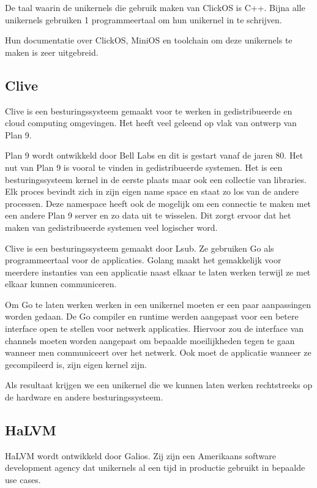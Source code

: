 \documentclass[pdftex,a4paper,12pt,twoside]{report}
\begin{document}
De taal waarin de unikernels die gebruik maken van ClickOS is C++. Bijna alle unikernels gebruiken 1 programmeertaal om hun unikernel in te schrijven.

Hun documentatie over ClickOS, MiniOS en toolchain om deze unikernels te maken is zeer uitgebreid.

\subsection{Clive}

Clive is een besturingssysteem gemaakt voor te werken in gedistribueerde en cloud computing omgevingen. Het heeft veel geleend op vlak van ontwerp van Plan 9. 

Plan 9 wordt ontwikkeld door Bell Labs en dit is gestart vanaf de jaren 80. Het nut van Plan 9 is vooral te vinden in gedistribueerde systemen. Het is een besturingssysteem kernel in de eerste plaats maar ook een collectie van libraries. Elk proces bevindt zich in zijn eigen name space en staat zo los van de andere processen. Deze namespace heeft ook de mogelijk om een connectie te maken met een andere Plan 9 server en zo data uit te wisselen. Dit zorgt ervoor dat het maken van gedistribueerde systemen veel logischer word.

Clive is een besturingssysteem gemaakt door Lsub. Ze gebruiken Go als programmeertaal voor de applicaties. Golang maakt het gemakkelijk voor meerdere instanties van een applicatie naast elkaar te laten werken terwijl ze met elkaar kunnen communiceren. 

Om Go te laten werken werken in een unikernel moeten er een paar aanpassingen worden gedaan. De Go compiler en runtime werden aangepast voor een betere interface open te stellen voor netwerk applicaties. Hiervoor zou de interface van channels moeten worden aangepast om bepaalde moeilijkheden tegen te gaan wanneer men communiceert over het netwerk. Ook moet de applicatie wanneer ze gecompileerd is,  zijn eigen kernel zijn.

Als resultaat krijgen we een unikernel die we kunnen laten werken rechtstreeks op de hardware en andere besturingssysteem.

\subsection{HaLVM}

HaLVM wordt ontwikkeld door Galios. Zij zijn een Amerikaans software development agency dat unikernels al een tijd in productie gebruikt in bepaalde use cases.
\end{document}
